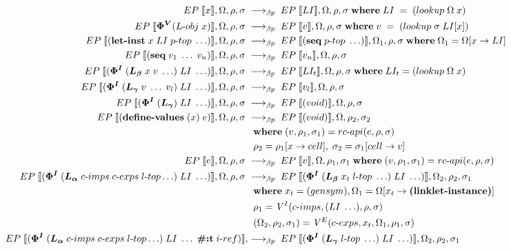 \documentclass[sigplan,screen,anonymous]{acmart}
\def\dash {\text{-}}
\begin{document}
\begin{figure}[tbp]
  \begin{align*}
    \redinput{x} \rel \redoutput{LI}{\Omega}{\rho}{\sigma} \where LI \; =\; (lookup\; \Omega\; x) \\
    \redinput{\bm{\Phi^V}(L\dash obj\; x)} \rel \redoutput{v}{\Omega}{\rho}{\sigma} \where v\; =\; (lookup\; \sigma\; LI[x]) \\
    \redinput{(\textbf{let\dash inst}\; x\; LI\; p\dash top\; \ldots)} \rel \redoutput{(\textbf{seq}\; p\dash top\; \ldots)}{\Omega_1}{\rho}{\sigma} \where \Omega_1 = \Omega[x\rightarrow LI] \\
    \redinput{(\textbf{seq}\; v_{1}\; \ldots\; v_{n})} \rel \redoutput{v_{n}}{\Omega}{\rho}{\sigma} \\
    \redinput{(\bm{\Phi^I}\; (\lb\; x\; v\; \ldots)\; LI\; \ldots)} \rel \redoutput{LI_t}{\Omega}{\rho}{\sigma} \where LI_t = (lookup\; \Omega\; x) \\
    \redinput{(\bm{\Phi^I}\; (\lc\; v\; \ldots\; v_{l})\; LI\; \ldots)} \rel \redoutput{v_{l}}{\Omega}{\rho}{\sigma} \\
    \redinput{(\bm{\Phi^I}\; (\lc)\; LI\; \ldots)} \rel \redoutput{(void)}{\Omega}{\rho}{\sigma} \\
    \redinput{(\textbf{define\dash values}\; (x)\; e)} \rel \redoutput{(void)}{\Omega}{\rho_2}{\sigma_2} \\
    \;          &\;\; \where (v,\rho_1,\sigma_1) = rc\dash api(e,\rho,\sigma) \\
    \;          &\;\; \rho_2 = \rho_1[x\rightarrow cell],\; \sigma_2 = \sigma_1[cell\rightarrow v]  \\
    \redinput{e} \rel \redoutput{v}{\Omega}{\rho_1}{\sigma_1} \where (v,\rho_1,\sigma_1) = rc\dash api(e,\rho,\sigma) \\
    \redinput{(\bm{\Phi^I}\; (\la\; c\dash imps \; c\dash exps \; l\dash top \ldots)\; LI\; \ldots)} \rel \redoutput{(\bm{\Phi^I}\; (\lb\; x_t\; l\dash top\; \ldots)\; LI\; \ldots)}{\Omega_2}{\rho_2}{\sigma_1} \\
    \;          &\;\; \where x_t = (gensym),  \Omega_1 = \Omega[x_t\rightarrow \textbf{(linklet-instance)}] \\
    \;          &\;\; \rho_1 = \mathit{V}^I(c\dash imps, (LI\; \ldots), \rho, \sigma) \\
    \;          &\;\; (\Omega_2, \rho_2, \sigma_1) = \mathit{V}^E(c\dash exps, x_t, \Omega_1, \rho_1, \sigma) \\
    EP\;\llbracket (\bm{\Phi^I}\; (\la\; c\dash imps \; c\dash exps \; l\dash top \ldots)\; LI\; \ldots\; \textbf{\#:t}\; i\dash ref) \rrbracket, \rel \redoutput{(\bm{\Phi^I}\; (\lc\; l\dash top\; \ldots)\; LI\; \ldots)}{\Omega_2}{\rho_2}{\sigma_1} \\

\end{align*}
\end{figure}
\end{document}
